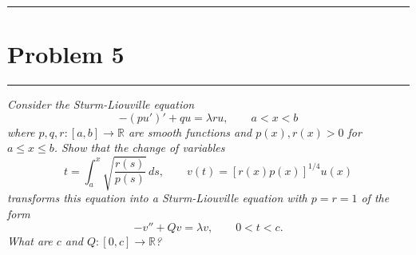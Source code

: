 \documentclass{article} %
\theoremstyle{plain}
\def\Rl{\mathbb{R}}
\newcommand{\problem}[1]{
\vspace{.375cm}
\begin{minipage}{\textwidth}
    \begin{center}
        \noindent\rule{5cm}{1pt}
    \end{center}
    \section{\bf #1}
    \begin{center}
        \noindent\rule{5cm}{1pt}
    \end{center}
    \vspace{0.25cm}
\end{minipage}
}
\begin{document}




\problem{Problem 5}
\emph{Consider the Sturm-Liouville equation
\[
-(pu')' + q u = \lambda r u,\qquad a<x<b
\]
where $p, q, r: [a,b] \to \Rl$ are smooth functions and $p(x), r(x) > 0$ for $a\le x\le b$.
Show that the change of variables
\[
t = \int_a^x \sqrt{\frac{r(s)}{p(s)}}\, ds,\qquad v(t) = \left[r(x) p(x)\right]^{1/4} u(x)
\]
transforms this equation into a  Sturm-Liouville equation with $p=r=1$ of the form
\[
-v'' + Q v = \lambda v,\qquad 0<t<c.
\]
What are $c$ and $Q:[0,c]\to \Rl$?
}
\end{document}
